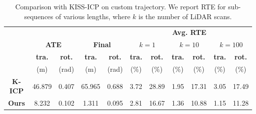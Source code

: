 \begin{table}[h]
    \centering
    {\small
        \begin{tabular}{c|cc|cc|cc|cc|cc}
            \hline
                           &                                    &                                     &                            &                             & \multicolumn{6}{c}{\textbf{Avg. RTE}}                                                                                 \\
                           & \multicolumn{2}{c|}{ \textbf{ATE}} & \multicolumn{2}{c|}{\textbf{Final}} & \multicolumn{2}{c|}{$k=1$} & \multicolumn{2}{c|}{$k=10$} & \multicolumn{2}{c}{$k=100$}                                                                                           \\
                           & \textbf{tra.}                      & \textbf{rot.}                       & \textbf{tra.}              & \textbf{rot.}               & \textbf{tra.}                         & \textbf{rot.} & \textbf{tra.} & \textbf{rot.} & \textbf{tra.} & \textbf{rot.} \\
                           & (m)                                & (rad)                               & (m)                        & (rad)                       & (\%)                                  & (\%)          & (\%)          & (\%)          & (\%)          & (\%)          \\
            \hline
            \hline
            \textbf{K-ICP} & 46.879                             & 0.407                               & 65.965                     & 0.688                       & 3.72                                  & 28.89         & 1.95          & 17.31         & 3.05          & 17.49         \\
            \textbf{Ours}  & 8.232                              & 0.102                               & 1.311                      & 0.095                       & 2.81                                  & 16.67         & 1.36          & 10.88         & 1.15          & 11.28         \\
            \hline
        \end{tabular}
    }
    \caption{Comparison with KISS-ICP \cite{vizzo2023ral} on custom trajectory. We report RTE for sub-sequences of various lengths, where $k$ is the number of LiDAR scans. }
    \label{tab:custom-traj-results}
\end{table}

